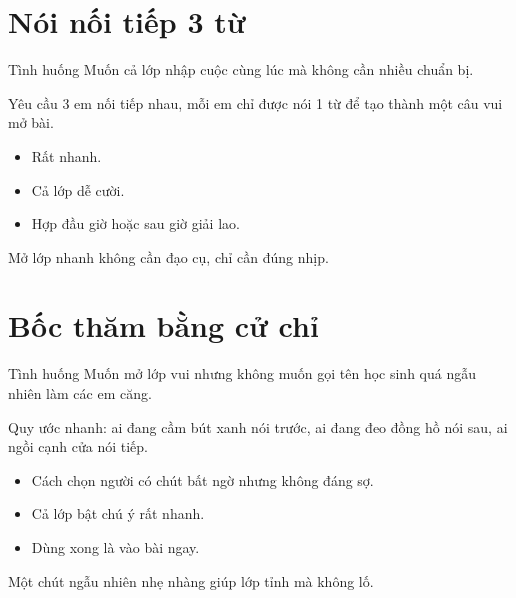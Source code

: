 \section{Nói nối tiếp 3 từ}
\begin{tinhhuong}{Tình huống}
Muốn cả lớp nhập cuộc cùng lúc mà không cần nhiều chuẩn bị.
\end{tinhhuong}
\begin{goiydungngay}
Yêu cầu 3 em nối tiếp nhau, mỗi em chỉ được nói 1 từ để tạo thành một câu vui mở bài.
\begin{itemize}
\item Rất nhanh.
\item Cả lớp dễ cười.
\item Hợp đầu giờ hoặc sau giờ giải lao.
\end{itemize}
\end{goiydungngay}
\begin{cauchot}
Mở lớp nhanh không cần đạo cụ, chỉ cần đúng nhịp.
\end{cauchot}
\ngancach

\section{Bốc thăm bằng cử chỉ}
\begin{tinhhuong}{Tình huống}
Muốn mở lớp vui nhưng không muốn gọi tên học sinh quá ngẫu nhiên làm các em căng.
\end{tinhhuong}
\begin{goiydungngay}
Quy ước nhanh: ai đang cầm bút xanh nói trước, ai đang đeo đồng hồ nói sau, ai ngồi cạnh cửa nói tiếp.
\begin{itemize}
\item Cách chọn người có chút bất ngờ nhưng không đáng sợ.
\item Cả lớp bật chú ý rất nhanh.
\item Dùng xong là vào bài ngay.
\end{itemize}
\end{goiydungngay}
\begin{cauchot}
Một chút ngẫu nhiên nhẹ nhàng giúp lớp tỉnh mà không lố.
\end{cauchot}
\ngancach

